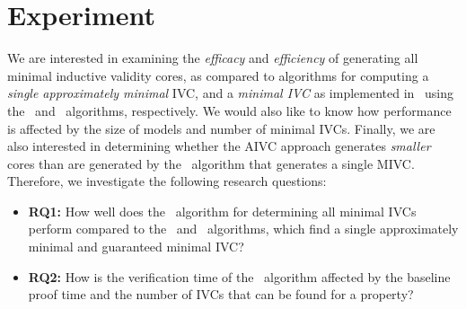 \section{Experiment}
\label{sec:experiment}

\newcommand{\takeaway}[1]{
\vspace{6pt}
\noindent\fbox{\parbox{\textwidth}{#1}}
\vspace{6pt}
}
We are interested in examining the {\em efficacy} and {\em efficiency} of generating all minimal inductive validity cores, as compared to algorithms for computing a {\em single approximately minimal} IVC, and a {\em minimal IVC} as implemented in~\cite{Ghass16} using the \ucalg\ and \ucbfalg\ algorithms, respectively.  We would also like to know how performance is affected by the size of models and number of minimal IVCs.  Finally, we are also interested in determining whether the AIVC approach generates {\em smaller} cores than are generated by the \ucbfalg\ algorithm that generates a single MIVC.  %
%
%
Therefore, we investigate the following research questions:
\begin{itemize}
  \item \textbf{RQ1:} How well does the \aivcalg ~algorithm for determining all minimal IVCs perform compared to the \ucalg ~and \ucbfalg ~algorithms, which find a single approximately minimal and guaranteed minimal IVC?
  \item \textbf{RQ2:} How is the verification time of the \aivcalg ~algorithm affected by the baseline proof time and the number of IVCs that can be found for a property?
%
\end{itemize}


